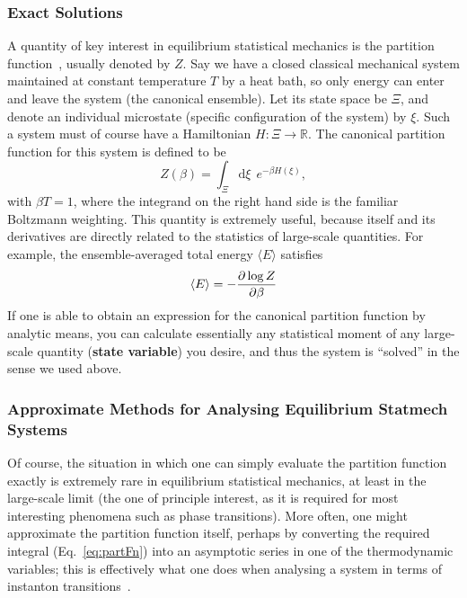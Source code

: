 \subsubsection{Exact Solutions}
A quantity of key interest in equilibrium statistical mechanics is the partition
function~\cite{martynovStatmech}, usually denoted by $Z$. Say we have a closed classical mechanical system maintained at constant temperature $T$ by a heat bath,
so only energy can enter and leave the system (the canonical ensemble). Let its state space be $\Xi$, and denote an individual microstate (specific configuration of the system) by $\xi$.
Such a system must of course have a Hamiltonian $H : \Xi \rightarrow \mathbb{R}$. The canonical partition function for this system is defined to be
\begin{equation} \label{eq:partFn}
 Z(\beta) = \int_\Xi  \! \! \mathrm{d}  \xi \  \  e^{- \beta H(\xi)},
\end{equation}
with $\beta T = 1$, where the integrand on the right hand side is the familiar Boltzmann weighting. This quantity is extremely useful, because itself and its derivatives are directly related to the statistics of large-scale quantities.
For example, the ensemble-averaged total energy $\langle E \rangle$ satisfies
\begin{equation}
 \langle E \rangle = - \frac{\partial \log{Z}}{\partial \beta}
\end{equation}
If one is able to obtain an expression for the canonical partition function by analytic means, you can calculate essentially any statistical moment of any large-scale quantity (\textbf{state variable})
you desire, and thus the system is ``solved'' in the sense we used above.



\subsubsection{Approximate Methods for Analysing Equilibrium Statmech Systems}
Of course, the situation in which one can simply evaluate the partition function exactly is
extremely rare in equilibrium statistical mechanics, at least in the large-scale limit (the one of
principle interest, as it is required for most interesting phenomena such as phase transitions).
More often, one might approximate the partition function itself, perhaps by converting the required
integral (Eq.~\ref{eq:partFn}) into an asymptotic series in one of the thermodynamic variables;
this is effectively what one does when analysing a system in terms of instanton transitions~\cite{grafke2015}.

